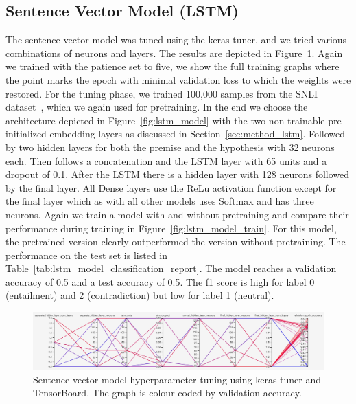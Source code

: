 \documentclass[acmsmall,nonacm]{acmart}
\begin{document}
\subsection{Sentence Vector Model (LSTM)}
The sentence vector model was tuned using the keras-tuner, and we tried various combinations of neurons and layers. The results are depicted in Figure~\ref{fig:lstm_hyperparameter_tuning}. Again we trained with the patience set to five, we show the full training graphs where the point marks the epoch with minimal validation loss to which the weights were restored. For the tuning phase, we trained 100,000 samples from the SNLI dataset~\cite{snli-bowman2015}, which we again used for pretraining. 
In the end we choose the architecture depicted in Figure~\ref{fig:lstm_model} with the two non-trainable pre-initialized embedding layers as discussed in Section~\ref{sec:method_lstm}. Followed by two hidden layers for both the premise and the hypothesis with 32 neurons each. Then follows a concatenation and the LSTM layer with 65 units and a dropout of 0.1. After the LSTM there is a hidden layer with 128 neurons followed by the final layer. All Dense layers use the ReLu activation function except for the final layer which as with all other models uses Softmax and has three neurons. Again we train a model with and without pretraining and compare their performance during training in Figure~\ref{fig:lstm_model_train}. For this model, the pretrained version clearly outperformed the version without pretraining. The performance on the test set is listed in Table~\ref{tab:lstm_model_classification_report}. The model reaches a validation accuracy of 0.5 and a test accuracy of 0.5. The f1 score is high for label 0 (entailment) and 2 (contradiction) but low for label 1 (neutral). 

\begin{figure}[h!]
  \includegraphics[width=1\textwidth]{assets/lstm_hyper_parameter_tuning.jpg}
  \caption{Sentence vector model hyperparameter tuning using keras-tuner and TensorBoard. The graph is colour-coded by validation accuracy.}
  \label{fig:lstm_hyperparameter_tuning}
\end{figure}
\end{document}
